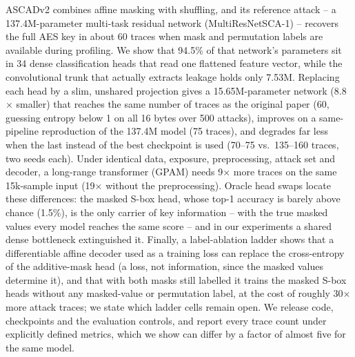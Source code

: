 ASCADv2 combines affine masking with shuffling, and its reference attack -- a 137.4M-parameter
multi-task residual network (MultiResNetSCA-1) -- recovers the full AES key in about 60 traces when
mask and permutation labels are available during profiling. We show that 94.5\% of that network's
parameters sit in 34 dense classification heads that read one flattened feature vector, while the
convolutional trunk that actually extracts leakage holds only 7.53M. Replacing each head by a slim,
unshared projection gives a 15.65M-parameter network (8.8$\times$ smaller) that reaches the same
number of traces as the original paper (60, guessing entropy below 1 on all 16 bytes over 500
attacks), improves on a same-pipeline reproduction of the 137.4M model (75 traces), and degrades far less
when the last instead of the best checkpoint is used (70--75 vs.\ 135--160 traces, two seeds each).
Under identical data, exposure, preprocessing, attack set and decoder, a long-range transformer
(GPAM) needs 9$\times$ more traces on the same 15k-sample input (19$\times$ without the
preprocessing).
Oracle head swaps locate these differences: the masked S-box head, whose top-1 accuracy is barely above
chance (1.5\%), is the only carrier of key information -- with the true masked values every model reaches
the same score -- and in our experiments a shared dense bottleneck extinguished it.
Finally, a label-ablation ladder shows that a differentiable affine decoder used as a training loss
can replace the cross-entropy of the additive-mask head (a loss, not information, since the
masked values determine it), and that with both masks still labelled it trains the masked S-box heads
without any masked-value or permutation label, at the cost of roughly 30$\times$ more attack traces;
we state which ladder cells remain open. We release code, checkpoints and the evaluation controls, and report every
trace count under explicitly defined metrics, which we show can differ by a factor of almost five for the
same model.


